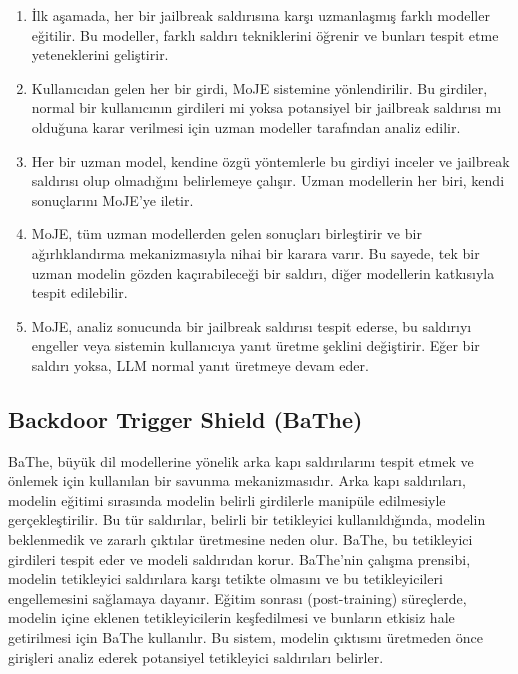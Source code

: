 \begin{enumerate}
    \item İlk aşamada, her bir jailbreak saldırısına karşı uzmanlaşmış farklı modeller eğitilir. Bu modeller, farklı saldırı tekniklerini öğrenir ve bunları tespit etme yeteneklerini geliştirir.
    \item Kullanıcıdan gelen her bir girdi, MoJE sistemine yönlendirilir. Bu girdiler, normal bir kullanıcının girdileri mi yoksa potansiyel bir jailbreak saldırısı mı olduğuna karar verilmesi için uzman modeller tarafından analiz edilir.
    \item Her bir uzman model, kendine özgü yöntemlerle bu girdiyi inceler ve jailbreak saldırısı olup olmadığını belirlemeye çalışır. Uzman modellerin her biri, kendi sonuçlarını MoJE’ye iletir.
    \item MoJE, tüm uzman modellerden gelen sonuçları birleştirir ve bir ağırlıklandırma mekanizmasıyla nihai bir karara varır. Bu sayede, tek bir uzman modelin gözden kaçırabileceği bir saldırı, diğer modellerin katkısıyla tespit edilebilir.
    \item MoJE, analiz sonucunda bir jailbreak saldırısı tespit ederse, bu saldırıyı engeller veya sistemin kullanıcıya yanıt üretme şeklini değiştirir. Eğer bir saldırı yoksa, LLM normal yanıt üretmeye devam eder.
\end{enumerate}

\newpage

\subsection{Backdoor Trigger Shield (BaThe)}

BaThe, büyük dil modellerine yönelik arka kapı saldırılarını tespit etmek ve önlemek için kullanılan bir savunma mekanizmasıdır. Arka kapı saldırıları, modelin eğitimi sırasında modelin belirli girdilerle manipüle edilmesiyle gerçekleştirilir. Bu tür saldırılar, belirli bir tetikleyici kullanıldığında, modelin beklenmedik ve zararlı çıktılar üretmesine neden olur. BaThe, bu tetikleyici girdileri tespit eder ve modeli saldırıdan korur. BaThe’nin çalışma prensibi, modelin tetikleyici saldırılara karşı tetikte olmasını ve bu tetikleyicileri engellemesini sağlamaya dayanır. Eğitim sonrası (post-training) süreçlerde, modelin içine eklenen tetikleyicilerin keşfedilmesi ve bunların etkisiz hale getirilmesi için BaThe kullanılır. Bu sistem, modelin çıktısını üretmeden önce girişleri analiz ederek potansiyel tetikleyici saldırıları belirler.

